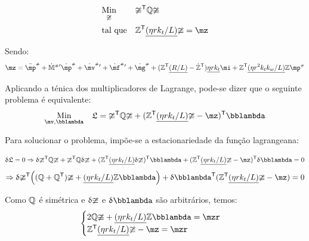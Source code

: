 \documentclass[a4paper,11pt,brazil,fleqn]{article}
\begin{document}
\begin{equation} \label{eq:Optimization_}
\begin{aligned}
& \underset{\mup}{\text{Min}}
& & \mup^\msT \mQ \mup \\
& \text{tal que}
& & \mZ^\msT  \underline{(\eta r k_t / L)} \mup = \mz
\end{aligned}
\end{equation}

Sendo:
\begin{equation} \label{eq:muplinha}
\mz = \ddot{\mp}\ssh + {{\dot{\mM}}\ssh}{'} \dot{\mp}\ssh + {\dot{\mv}\ssh}{'} + {\dot{\mf}\ssh}{'} + {\dot{\mg}\ssh} + ( \mZ^\msT  \underline{(R/L)} - \dot{\mZ}^\msT ) \underline{\eta r k_t} \mi + \mZ^\msT  \underline{(\eta r^2 k_t k_w / L)}  \mZ \mp\ssh
\end{equation}

Aplicando a t\'enica dos multiplicadores de Lagrange, pode-se dizer que o seguinte problema \'e equivalente:
\begin{equation}
\begin{aligned}
& \underset{\mv, \mlambda}{\text{Min}}
& & \mathfrak{L} = \mup^\msT \mQ \mup + (\mZ^\msT  \underline{(\eta r k_t / L)} \mup - \mz)^\msT \mlambda \\
\end{aligned}
\end{equation}


Para solucionar o problema, imp\~oe-se a estacionariedade da fun\c{c}\~ao lagrangeana:

$$ \dl \mathfrak{L} = 0 \Rightarrow \dl \mup^\msT \mQ \mup + \mup^\msT \mQ \dl \mup + (\mZ^\msT  \underline{(\eta r k_t / L)} \dl \mup)^\msT \mlambda + (\mZ^\msT  \underline{(\eta r k_t / L)} \mup - \mz)^\msT \dl \mlambda = 0 $$
$$ \Rightarrow \dl \mup^\msT \Big( (\mQ + \mQ^\msT)\mup + \underline{(\eta r k_t / L)} \mZ \mlambda \Big) + \dl \mlambda^\msT (\mZ^\msT  \underline{(\eta r k_t / L)} \mup - \mz) = 0 $$

Como $\mathbb{Q}$ \'e sim\'etrica e ${\updelta} \mathbb{\upsilon}$ e $\dl \mlambda$ s\~ao arbitr\'arios, temos:
\begin{equation} \label{eq:OptimizationSol_}
\begin{cases}
2 \mQ \mup + \underline{(\eta r k_t / L)} \mZ \mlambda = \mzr \\
\mZ^\msT  \underline{(\eta r k_t / L)} \mup - \mz = \mzr
\end{cases}
\end{equation}
\end{document}
